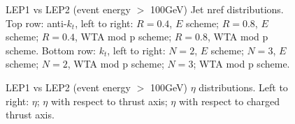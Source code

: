 \begin{figure}[H]
\hfill
\caption{LEP1 vs LEP2 (event energy $>$ 100GeV) Jet nref distributions. Top row: anti-$k_t$, left to right: $R=0.4$, $E$ scheme; $R=0.8$, $E$ scheme; $R=0.4$, WTA mod p scheme; $R=0.8$, WTA mod p scheme. Bottom row: $k_t$, left to right: $N=2$, $E$ scheme; $N=3$, $E$ scheme; $N=2$, WTA mod p scheme; $N=3$; WTA mod p scheme.}  
\end{figure}

\begin{figure}[H]
\centering
{}\hfill
{}\hfill
{}\hfill
\caption{LEP1 vs LEP2 (event energy $>$ 100GeV) $\eta$ distributions. Left to right: $\eta$; $\eta$ with respect to thrust axis; $\eta$ with respect to charged thrust axis.}
\end{figure}

